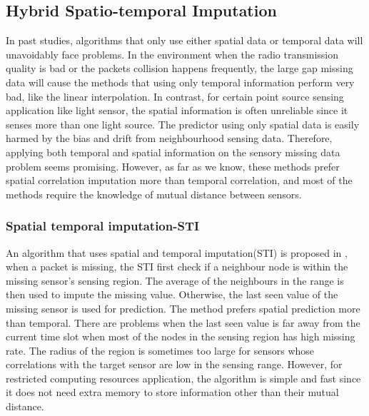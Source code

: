 \subsection{Hybrid Spatio-temporal Imputation}    
In past studies, algorithms that only use either spatial data or temporal data will unavoidably face problems. In the environment when the radio transmission quality is bad or the packets collision happens frequently, the large gap missing data will cause the methods that using only temporal information perform very bad, like the linear interpolation. In contrast, for certain point source sensing application like light sensor, the spatial information is often unreliable since it senses more than one light source. The predictor using only spatial data is easily harmed by the bias and drift from neighbourhood sensing data. Therefore, applying both temporal and spatial information on the sensory missing data problem seems promising. However, as far as we know, these methods prefer spatial correlation imputation more than temporal correlation, and most of the methods require the knowledge of mutual distance between sensors.     
\subsubsection{Spatial temporal imputation-STI}
An algorithm that uses spatial and temporal imputation(STI) is proposed in \cite{Li:STI}, when a packet is missing, the STI first check if a neighbour node is within the missing sensor's sensing region. The average of the neighbours in the range is then used to impute the missing value. Otherwise, the last seen value of the missing sensor is used for prediction. The method prefers spatial prediction more than temporal. There are problems when the last seen value is far away from the current time slot when most of the nodes in the sensing region has high missing rate. The radius of the region is sometimes too large for sensors whose correlations with the target sensor are low in the sensing range. However, for restricted computing resources application, the algorithm is simple and fast since it does not need extra memory to store information other than their mutual distance. 
